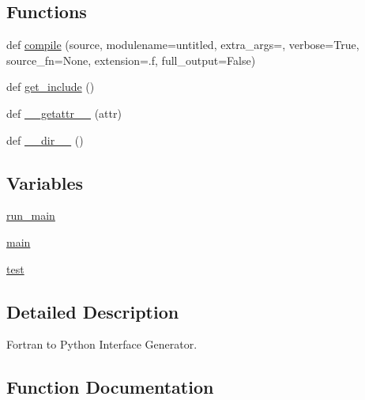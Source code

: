 \subsection*{Functions}
\begin{DoxyCompactItemize}
\item 
def \hyperlink{namespacenumpy_1_1f2py_a7147a103fc7e183b7293a8d1875ac811}{compile} (source, modulename=\textquotesingle{}untitled\textquotesingle{}, extra\+\_\+args=\textquotesingle{}\textquotesingle{}, verbose=True, source\+\_\+fn=None, extension=\textquotesingle{}.f\textquotesingle{}, full\+\_\+output=False)
\item 
def \hyperlink{namespacenumpy_1_1f2py_a86217766518812d31ed0d0d013e34f44}{get\+\_\+include} ()
\item 
def \hyperlink{namespacenumpy_1_1f2py_a62e42f028958f5e5b33efa5da3a0d233}{\+\_\+\+\_\+getattr\+\_\+\+\_\+} (attr)
\item 
def \hyperlink{namespacenumpy_1_1f2py_ad884293624bce4c29b240358e0d72371}{\+\_\+\+\_\+dir\+\_\+\+\_\+} ()
\end{DoxyCompactItemize}
\subsection*{Variables}
\begin{DoxyCompactItemize}
\item 
\hyperlink{namespacenumpy_1_1f2py_a919efb5b504fa6d7d964c281a6df424e}{run\+\_\+main}
\item 
\hyperlink{namespacenumpy_1_1f2py_aa1d5945d8dfb724d522255a5800ceb6a}{main}
\item 
\hyperlink{namespacenumpy_1_1f2py_aa503223006f0a755dbcd59201c29a32e}{test}
\end{DoxyCompactItemize}


\subsection{Detailed Description}
\begin{DoxyVerb}Fortran to Python Interface Generator.\end{DoxyVerb}
 

\subsection{Function Documentation}
\mbox{\label{namespacenumpy_1_1f2py_ad884293624bce4c29b240358e0d72371}} 
